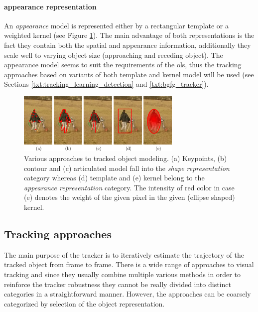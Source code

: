 \paragraph{appearance representation} 
An \textit{appearance} model is represented either by a rectangular template \cite{ProbabilisticVisualTrackingTemplate, ObjectTrackinginMonochromaticVideo} or a weighted kernel \cite{Comaniciu:2003:KOT:776753.776799, MultipleCollaborativeKernelTracking} (see Figure \ref{fig:object_models}). The main advantage of both representations is the fact they contain both the spatial and appearance information, additionally they scale well to varying object size (approaching and receding object). The appearance model seems to suit the requirements of the \gls{ols}, thus the tracking approaches based on variants of both template and kernel model will be used (see Sections \ref{txt:tracking_learning_detection} and \ref{txt:bgfg_tracker}).

\begin{figure}[tbh]
	\centering
	\includegraphics[width=0.7\textwidth]{fig/object_model.pdf}
	\caption{Various approaches to tracked object modeling. (a) Keypoints, (b) contour and (c) articulated model fall into the \textit{shape representation} category whereas (d) template and (e) kernel belong to the \textit{appearance representation} category. The intensity of red color in case (e) denotes the weight of the given pixel in the given (ellipse shaped) kernel.}
	\label{fig:object_models}
\end{figure}

\subsection{Tracking approaches}

The main purpose of the tracker is to iteratively estimate the trajectory of the tracked object from frame to frame. There is a wide range of approaches to visual tracking and since they usually combine multiple various methods in order to reinforce the tracker robustness they cannot be really divided into distinct categories in a straightforward manner. However, the approaches can be coarsely categorized by selection of the object representation.

